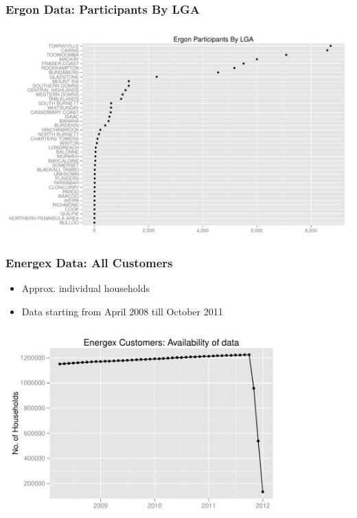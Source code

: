 \documentclass{beamer}
\begin{document}
\begin{frame}
\frametitle{Ergon Data: Participants By LGA}
\begin{center}
\includegraphics[width=1\textwidth]{figures/ErgonLGA}
\end{center}
\end{frame}

\begin{frame}
\frametitle{Energex Data: All Customers}
\begin{itemize}
\item Approx.  individual households
\item Data starting from April 2008 till October 2011
\end{itemize}
\begin{center}
\includegraphics[width=0.8\textwidth]{figures/EnergexAvailData}
\end{center}
\end{frame}
\end{document}
